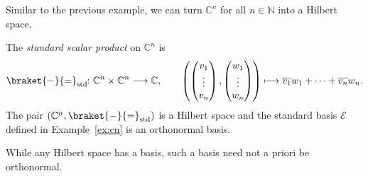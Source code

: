 \documentclass[a4paper, oneside, 12pt]{amsart}
\begin{document}
Similar to the previous example, we can turn \( \mathbb{C}^{n}\) for all \(n\in \mathbb{N}\) into a Hilbert space.

\begin{example}\label{ex:cn-as-Hilbert-space}
  The \emph{standard scalar product} on \( \mathbb{C}^{n}\) is
  \begin{equation*}
    \braket{ \blank }{ \bblank }_{\mathrm{std}}\from \mathbb{C}^{n}\times \mathbb{C}^{n}\to \mathbb{C}, \qquad
    \left(
      \begin{pmatrix}
        v_{1} \\ \vdots \\ v_{n}
      \end{pmatrix},
      \begin{pmatrix}
        w_{1} \\ \vdots \\ w_{n}
      \end{pmatrix}
    \right)
    \mapsto \overline{v_{1}}w_{1} + \dots + \overline{v_{n}}w_{n}.
  \end{equation*}
  The pair \(( \mathbb{C}^{n}, \braket{ \blank }{ \bblank }_{\mathrm{std}})\) is a Hilbert space and the standard basis \(\mathcal{E}\) defined in Example~\ref{ex:cn} is an orthonormal basis.
\end{example}

While any Hilbert space has a basis, such a basis need not a priori be orthonormal.
\end{document}
